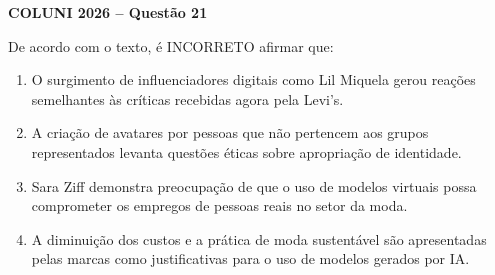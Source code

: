 \textbf{COLUNI 2026 -- Questão 21}\par\medskip De acordo com o texto, é INCORRETO afirmar que:\begin{enumerate}
\item O surgimento de influenciadores digitais como Lil Miquela gerou reações semelhantes às críticas recebidas agora pela Levi’s.
\item A criação de avatares por pessoas que não pertencem aos grupos representados levanta questões éticas sobre apropriação de identidade.
\item Sara Ziff demonstra preocupação de que o uso de modelos virtuais possa comprometer os empregos de pessoas reais no setor da moda.
\item A diminuição dos custos e a prática de moda sustentável são apresentadas pelas marcas como justificativas para o uso de modelos gerados por IA.\end{enumerate}

